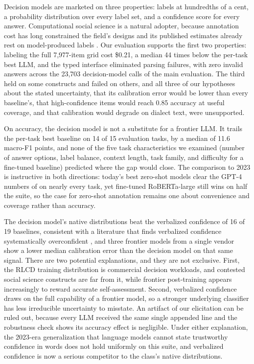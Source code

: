 \documentclass[11pt]{article}
\begin{document}
Decision models are marketed on three properties: labels at hundredths of a cent, a probability distribution over every label set, and a confidence score for every answer. Computational social science is a natural adopter, because annotation cost has long constrained the field's designs \citep{lazer2009computational} and its published estimates already rest on model-produced labels \citep{gilardi2023chatgpt, tornberg2023chatgpt}. Our evaluation supports the first two properties: labeling the full 7{,}977-item grid cost \$0.21, a median 44 times below the per-task best LLM, and the typed interface eliminated parsing failures, with zero invalid answers across the 23{,}703 decision-model calls of the main evaluation. The third held on some constructs and failed on others, and all three of our hypotheses about the stated uncertainty, that its calibration error would be lower than every baseline's, that high-confidence items would reach 0.85 accuracy at useful coverage, and that calibration would degrade on dialect text, were unsupported.

On accuracy, the decision model is not a substitute for a frontier LLM. It trails the per-task best baseline on 14 of 15 evaluation tasks, by a median of 11.6 macro-F1 points, and none of the five task characteristics we examined (number of answer options, label balance, context length, task family, and difficulty for a fine-tuned baseline) predicted where the gap would close. The comparison to 2023 is instructive in both directions: today's best zero-shot models clear the GPT-4 numbers of \citet{ziems2024llms} on nearly every task, yet fine-tuned RoBERTa-large still wins on half the suite, so the case for zero-shot annotation remains one about convenience and coverage rather than accuracy.

The decision model's native distributions beat the verbalized confidence of 16 of 19 baselines, consistent with a literature that finds verbalized confidence systematically overconfident \citep{xiong2023can, tian2023just}, and three frontier models from a single vendor show a lower median calibration error than the decision model on that same signal. There are two potential explanations, and they are not exclusive. First, the RLCD training distribution is commercial decision workloads, and contested social science constructs are far from it, while frontier post-training appears increasingly to reward accurate self-assessment. Second, verbalized confidence draws on the full capability of a frontier model, so a stronger underlying classifier has less irreducible uncertainty to misstate. An artifact of our elicitation can be ruled out, because every LLM received the same single appended line and the robustness check shows its accuracy effect is negligible. Under either explanation, the 2023-era generalization that language models cannot state trustworthy confidence in words does not hold uniformly on this suite, and verbalized confidence is now a serious competitor to the class's native distributions.
\end{document}
